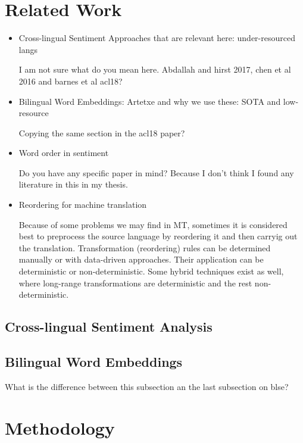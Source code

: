 \documentclass[11pt,a4paper]{article}
\begin{document}
\section{Related Work}

\begin{itemize}

\item Cross-lingual Sentiment Approaches that are relevant here: under-resourced langs

I am not sure what do you mean here. Abdallah and hirst 2017, chen et al 2016 and barnes et al acl18?

\item Bilingual Word Embeddings: Artetxe and why we use these: SOTA and low-resource

Copying the same section in the acl18 paper?

\item Word order in sentiment

Do you have any specific paper in mind? Because I don't think I found any literature in this in my thesis.

\item Reordering for machine translation

Because of some problems we may find in MT, sometimes it is considered best to preprocess the source language by reordering it and then carryig out the translation. Transformation (reordering) rules can be determined manually or with data-driven approaches. Their application can be deterministic or non-deterministic. Some hybrid techniques exist as well, where long-range transformations are deterministic and the rest non-deterministic.

\end{itemize}

\subsection{Cross-lingual Sentiment Analysis}

\cite{Mohammad2015b}

\subsection{Bilingual Word Embeddings}

What is the difference between this subsection an the last subsection on blse?

\section{Methodology}
\end{document}
